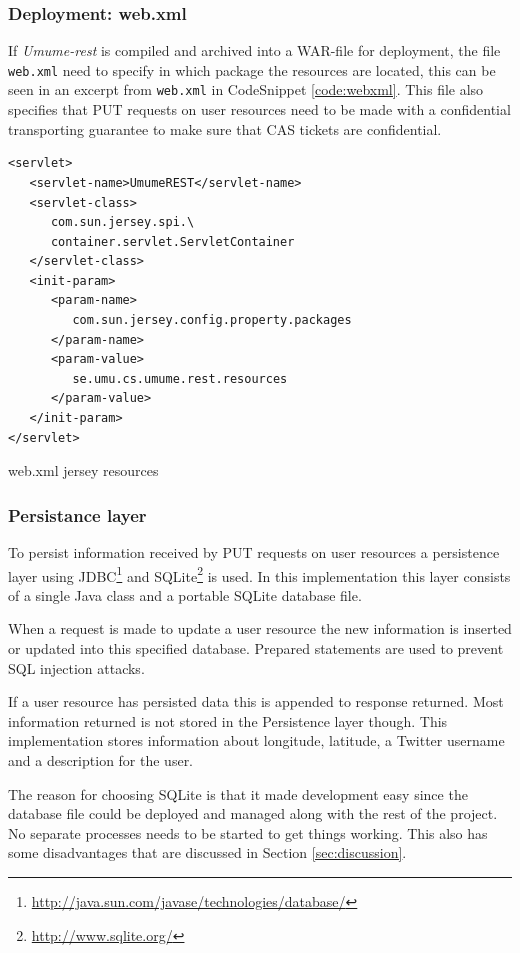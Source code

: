 \documentclass[titlepage, twocolumn, a4paper, 10pt]{article}
\begin{document}
\subsubsection{Deployment: web.xml}
If \textit{Umume-rest} is compiled and archived into a WAR-file for
deployment, the file \texttt{web.xml} need to specify in which package
the resources are located, this can be seen in an excerpt from
\texttt{web.xml} in CodeSnippet \ref{code:webxml}. This file also
specifies that PUT requests on user resources need to be made with a
confidential transporting guarantee to make sure that CAS tickets are
confidential.

\begin{code}
  \begin{footnotesize}
\begin{verbatim}
<servlet>
   <servlet-name>UmumeREST</servlet-name>
   <servlet-class>
      com.sun.jersey.spi.\
      container.servlet.ServletContainer
   </servlet-class>
   <init-param>
      <param-name>
         com.sun.jersey.config.property.packages
      </param-name>
      <param-value>
         se.umu.cs.umume.rest.resources
      </param-value>
   </init-param>
</servlet>
\end{verbatim}
  \end{footnotesize}
  \caption{web.xml jersey resources}\label{code:webxml}
\end{code}

\subsubsection{Persistance layer}\label{sec:persistance}
To persist information received by PUT requests on user resources a persistence layer using JDBC\footnote{\url{http://java.sun.com/javase/technologies/database/}} and SQLite\footnote{\url{http://www.sqlite.org/}} is used. In this implementation this layer consists of a single Java class and a portable SQLite database file.

When a request is made to update a user resource the new information
is inserted or updated into this specified database. Prepared
statements are used to prevent SQL injection attacks.

If a user resource has persisted data this is appended to response
returned. Most information returned is not stored in the Persistence
layer though. This implementation stores information about longitude,
latitude, a Twitter username and a description for the user.

The reason for choosing SQLite is that it made development easy since
the database file could be deployed and managed along with the rest of
the project. No separate processes needs to be started to get things
working. This also has some disadvantages that are discussed in
Section \ref{sec:discussion}.
\end{document}
